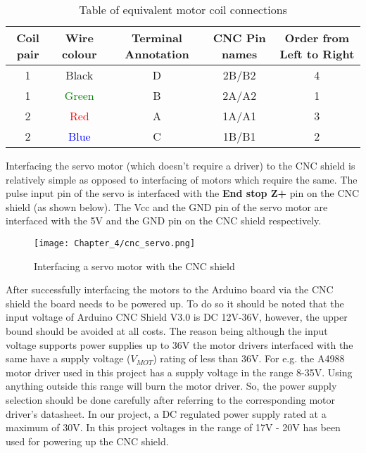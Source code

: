 \begin{table}[h]
\def\arraystretch{1.5}
    \centering
    \caption{Table of equivalent motor coil connections}
    \begin{tabular}{|c|c|c|c|c|}
        \hline
		Coil pair &	Wire colour & Terminal Annotation &	CNC Pin names &	Order from Left to Right  \\
		\hline
		1 & Black &	D &	2B/B2 &	4 \\
		\hline
		1 & \textcolor{green}{Green} &	B &	2A/A2 &	1 \\ 
		\hline 
		2 &	\textcolor{red}{Red} & A & 1A/A1 & 3 \\
		\hline
		2 &	\textcolor{blue}{Blue} & C & 1B/B1 & 2 \\
		\hline
    \end{tabular}
    \label{tab:mccons}
\end{table}


Interfacing the servo motor (which doesn’t require a driver) to the CNC shield is relatively simple as opposed to interfacing of motors which require the same. The pulse input pin of the servo is interfaced with the \textbf{End stop Z+} pin on the CNC shield (as shown below). The Vcc and the GND pin of the servo motor are interfaced with the 5V and the GND pin on the CNC shield respectively. \par

\begin{figure}[h]
 \centering
 \texttt{[image: Chapter\_4/cnc\_servo.png]}
 \caption{Interfacing a servo motor with the CNC shield}
 \label{fig:cnc_servo}
\end{figure}

After successfully interfacing the motors to the Arduino board via the CNC shield the board needs to be powered up. To do so it should be noted that the input voltage of Arduino CNC Shield V3.0 is DC 12V-36V, however, the upper bound should be avoided at all costs. The reason being although the input voltage supports power supplies up to 36V the motor drivers interfaced with the same have a supply voltage ($V_{MOT}$) rating of less than 36V. For e.g. the A4988 motor driver used in this project has a supply voltage in the range 8-35V. Using anything outside this range will burn the motor driver. So, the power supply selection should be done carefully after referring to the corresponding motor driver’s datasheet. In our project, a DC regulated power supply rated at a maximum of 30V. In this project voltages in the range of 17V - 20V has been used for powering up the CNC shield. \par

